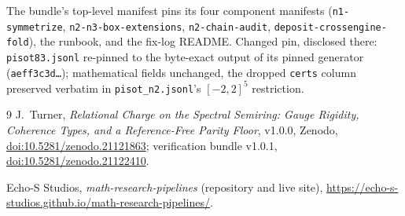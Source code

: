 \documentclass[11pt]{article}
\theoremstyle{definition}
\begin{document}
{\sloppy
\noindent The bundle's top-level manifest pins its four component manifests
(\texttt{n1-symmetrize}, \texttt{n2-n3-box-extensions},
\texttt{n2-chain-audit}, \texttt{deposit-crossengine-fold}), the runbook, and
the fix-log README. Changed pin, disclosed there: \texttt{pisot83.jsonl}
re-pinned to the byte-exact output of its pinned generator
(\texttt{aeff3c3d\ldots}); mathematical fields unchanged, the dropped
\texttt{certs} column preserved verbatim in \texttt{pisot\_n2.jsonl}'s
$[-2,2]^5$ restriction.\par}

\begin{thebibliography}{9}
J.~Turner,
\emph{Relational Charge on the Spectral Semiring: Gauge Rigidity, Coherence
Types, and a Reference-Free Parity Floor}, v1.0.0, Zenodo,
\href{https://doi.org/10.5281/zenodo.21121863}{doi:10.5281/zenodo.21121863};
verification bundle v1.0.1,
\href{https://doi.org/10.5281/zenodo.21122410}{doi:10.5281/zenodo.21122410}.

Echo-S Studios, \emph{math-research-pipelines} (repository and live site),
\url{https://echo-s-studios.github.io/math-research-pipelines/}.
\end{thebibliography}
\end{document}
